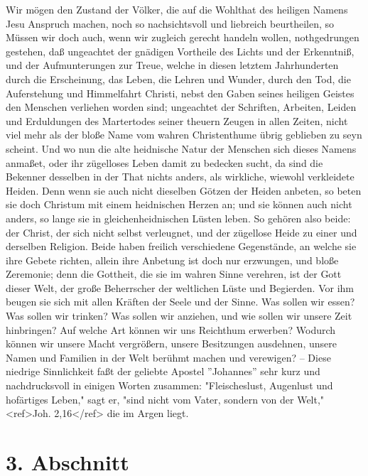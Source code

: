 Wir mögen den Zustand der Völker, die auf die Wohlthat des heiligen Namens Jesu Anspruch machen, noch so nachsichtsvoll und liebreich beurtheilen, so Müssen wir doch auch, wenn wir zugleich gerecht handeln wollen, nothgedrungen gestehen, daß ungeachtet der gnädigen Vortheile des Lichts und der Erkenntniß, und der Aufmunterungen zur Treue, welche in diesen letztem Jahrhunderten durch die Erscheinung, das Leben, die Lehren und Wunder, durch den Tod, die Auferstehung und Himmelfahrt Christi, nebst den Gaben seines heiligen Geistes den Menschen verliehen worden sind; ungeachtet der Schriften, Arbeiten, Leiden und Erduldungen des Martertodes seiner theuern Zeugen in allen Zeiten, nicht viel mehr als der bloße Name vom wahren Christenthume übrig geblieben zu seyn scheint. Und wo nun die alte heidnische Natur der Menschen sich dieses Namens anmaßet, oder ihr zügelloses Leben damit zu bedecken sucht, da sind die Bekenner desselben in der That nichts anders, als wirkliche, wiewohl verkleidete Heiden. Denn wenn sie auch nicht dieselben Götzen der Heiden anbeten, so beten sie doch Christum mit einem heidnischen Herzen an; und sie können auch nicht anders, so lange sie in gleichenheidnischen Lüsten leben. So gehören also beide: der Christ, der sich nicht selbst verleugnet, und der zügellose Heide zu einer und derselben Religion. Beide haben freilich verschiedene Gegenstände, an welche sie ihre Gebete richten, allein ihre Anbetung ist doch nur erzwungen, und bloße Zeremonie; denn die Gottheit, die sie im wahren Sinne verehren, ist der Gott dieser Welt, der große Beherrscher der weltlichen Lüste und Begierden. Vor ihm beugen sie sich mit allen Kräften der Seele und der Sinne. Was sollen wir essen? Was sollen wir trinken? Was sollen wir anziehen, und wie sollen wir unsere Zeit hinbringen? Auf welche Art können wir uns Reichthum erwerben? Wodurch können wir unsere Macht vergrößern, unsere Besitzungen ausdehnen, unsere Namen und Familien in der Welt berühmt machen und verewigen? – Diese niedrige Sinnlichkeit faßt der geliebte Apostel ''Johannes'' sehr kurz und nachdrucksvoll in einigen Worten zusammen: "Fleischeslust, Augenlust und hofärtiges Leben," sagt er, "sind nicht vom Vater, sondern von der Welt,"<ref>Joh. 2,16</ref> die im Argen liegt. 

\section{3. Abschnitt}


